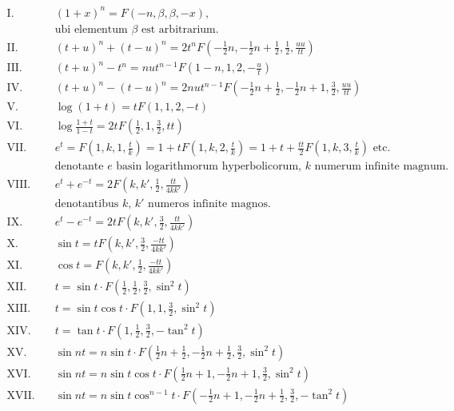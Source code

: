 \documentclass[12pt,a4paper]{article}
\newcommand{\1}{\ensuremath{\mathrlap{\,|\,}}} %
\begin{document}
\begin{align*}
\text{I.} \quad & (1+x)^n = F(-n, \beta, \beta, -x),\\
&\text{ubi elementum $\beta$ est arbitrarium.}\\[4pt]
\text{II.} \quad & (t+u)^n + (t-u)^n = 2t^n F(-\tfrac{1}{2}n, -\tfrac{1}{2}n+\tfrac{1}{2}, \tfrac{1}{2}, \tfrac{uu}{tt})\\[4pt]
\text{III.} \quad & (t+u)^n - t^n = nut^{n-1} F(1-n, 1, 2, -\tfrac{u}{t})\\[4pt]
\text{IV.} \quad & (t+u)^n - (t-u)^n = 2nut^{n-1} F(-\tfrac{1}{2}n+\tfrac{1}{2}, -\tfrac{1}{2}n+1, \tfrac{3}{2}, \tfrac{uu}{tt})\\[4pt]
\text{V.} \quad & \log(1+t) = tF(1, 1, 2, -t)\\[4pt]
\text{VI.} \quad & \log\frac{1+t}{1-t} = 2tF(\tfrac{1}{2}, 1, \tfrac{3}{2}, tt)\\[4pt]
\text{VII.} \quad & e^t = F(1, k, 1, \tfrac{t}{k}) = 1 + tF(1, k, 2, \tfrac{t}{k}) = 1 + t + \tfrac{tt}{2}F(1, k, 3, \tfrac{t}{k}) \text{ etc.}\\
&\text{denotante $e$ basin logarithmorum hyperbolicorum, $k$ numerum infinite magnum.}\\[4pt]
\text{VIII.} \quad & e^t + e^{-t} = 2F(k, k', \tfrac{1}{2}, \tfrac{tt}{4kk'})\\
&\text{denotantibus $k$, $k'$ numeros infinite magnos.}\\[4pt]
\text{IX.} \quad & e^t - e^{-t} = 2tF(k, k', \tfrac{3}{2}, \tfrac{tt}{4kk'})\\[4pt]
\text{X.} \quad & \sin t = tF(k, k', \tfrac{3}{2}, \tfrac{-tt}{4kk'})\\[4pt]
\text{XI.} \quad & \cos t = F(k, k', \tfrac{1}{2}, \tfrac{-tt}{4kk'})\\[4pt]
\text{XII.} \quad & t = \sin t \cdot F(\tfrac{1}{2}, \tfrac{1}{2}, \tfrac{3}{2}, \sin^2 t)\\[4pt]
\text{XIII.} \quad & t = \sin t \cos t \cdot F(1, 1, \tfrac{3}{2}, \sin^2 t)\\[4pt]
\text{XIV.} \quad & t = \tan t \cdot F(1, \tfrac{1}{2}, \tfrac{3}{2}, -\tan^2 t)\\[4pt]
\text{XV.} \quad & \sin nt = n\sin t \cdot F(\tfrac{1}{2}n+\tfrac{1}{2}, -\tfrac{1}{2}n+\tfrac{1}{2}, \tfrac{3}{2}, \sin^2 t)\\[4pt]
\text{XVI.} \quad & \sin nt = n\sin t \cos t \cdot F(\tfrac{1}{2}n+1, -\tfrac{1}{2}n+1, \tfrac{3}{2}, \sin^2 t)\\[4pt]
\text{XVII.} \quad & \sin nt = n\sin t \cos^{n-1} t \cdot F(-\tfrac{1}{2}n+1, -\tfrac{1}{2}n+\tfrac{1}{2}, \tfrac{3}{2}, -\tan^2 t)\\[4pt]

\end{align*}
\end{document}
